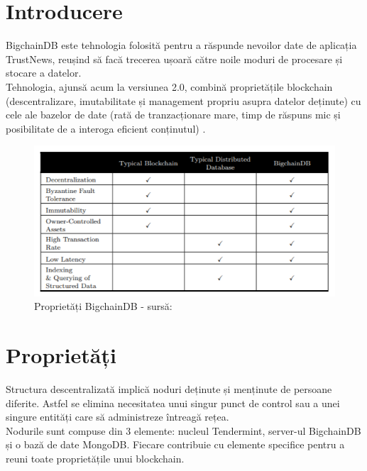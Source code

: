 \section{Introducere}

BigchainDB este tehnologia folosită pentru a răspunde nevoilor date de aplicația TrustNews, reușind să facă trecerea ușoară către noile moduri de procesare și stocare a datelor.\\

Tehnologia, ajunsă acum la versiunea 2.0, combină proprietățile blockchain (descentralizare, imutabilitate și management propriu asupra datelor deținute) cu cele ale bazelor de date (rată de tranzacționare mare, timp de răspuns mic și posibilitate de a interoga eficient conținutul) \cite{BigchainDB_Art}.\\

\begin{figure}[H] 
\centering
\includegraphics[scale=1]{Images/BCDB_Props.png}
\caption{Proprietăți BigchainDB - sursă: \cite{BigchainDB_Art}}
\end{figure}

\section{Proprietăți}

Structura descentralizată implică noduri deținute și menținute de persoane diferite. Astfel se elimina necesitatea unui singur punct de control sau a unei singure entități care să administreze întreagă rețea.\\

Nodurile sunt compuse din 3 elemente: nucleul Tendermint, server-ul BigchainDB și o bază de date MongoDB. Fiecare contribuie cu elemente specifice pentru a reuni toate proprietățile unui blockchain.\\

